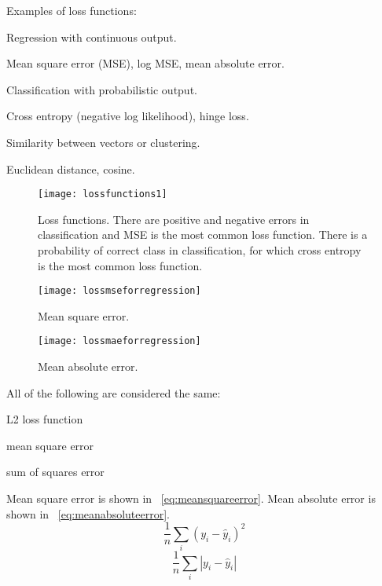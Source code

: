 Examples of loss functions:
	\begin{bulletedlist}
		\item Regression with continuous output.
		\begin{bulletedlist}
			\item Mean square error (MSE), log MSE, mean absolute error.
		\end{bulletedlist}
		\item Classification with probabilistic output.
		\begin{bulletedlist}
			\item Cross entropy (negative log likelihood), hinge loss.
		\end{bulletedlist}
		\item Similarity between vectors or clustering.
		\begin{bulletedlist}
			\item Euclidean distance, cosine.
		\end{bulletedlist}
	\end{bulletedlist}

 	\begin{figure}[h]
		\centering
		\texttt{[image: lossfunctions1]}
		\caption[Loss functions]{Loss functions.  There are positive and negative errors in classification and MSE is the most common loss function.  There is a probability of correct class in classification, for which cross entropy is the most common loss function.}
		\label{fig:lossfunctions1}
	\end{figure}
 	\begin{figure}[h]
		\centering
		\texttt{[image: lossmseforregression]}
		\caption[Mean square error]{Mean square error.}
		\label{fig:lossmseforregression}
	\end{figure}
 	\begin{figure}[h]
		\centering
		\texttt{[image: lossmaeforregression]}
		\caption[Mean absolute error]{Mean absolute error.}
		\label{fig:lossmaeforregression}
	\end{figure}


All of the following are considered the same:
	\begin{bulletedlist}
		\item L2 loss function
		\item mean square error
		\item sum of squares error
	\end{bulletedlist}

Mean square error is shown in \equationname~\ref{eq:meansquareerror}.  Mean absolute error is shown in \equationname~\ref{eq:meanabsoluteerror}.
	\begin{equation}
		\frac{1}{n} \sum_i \left( y_i - \hat{y}_i \right)^2
		\label{eq:meansquareerror}
	\end{equation}
	\begin{equation}
		\frac{1}{n} \sum_i \left| y_i - \hat{y}_i \right|
		\label{eq:meanabsoluteerror}
	\end{equation}	
	\begin{mathwhere}
	\end{mathwhere}

